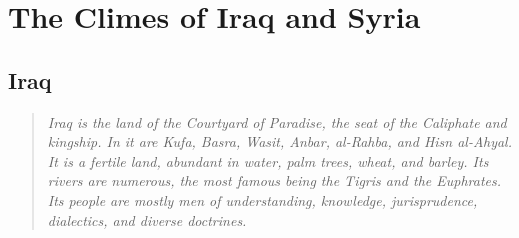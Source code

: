 \documentclass[11pt,a4paper]{article}
\begin{document}





\section{The Climes of Iraq and Syria}



\subsection{Iraq}



{\small\arabicfont

}



\bigskip



\begin{quote}

\small

\textit{Iraq is the land of the Courtyard of Paradise, the seat of the Caliphate and kingship. In it are Kufa, Basra, Wasit, Anbar, al-Rahba, and Hisn al-Ahyal. It is a fertile land, abundant in water, palm trees, wheat, and barley. Its rivers are numerous, the most famous being the Tigris and the Euphrates. Its people are mostly men of understanding, knowledge, jurisprudence, dialectics, and diverse doctrines.}

\end{quote}



\vspace{0.5cm}
\end{document}
